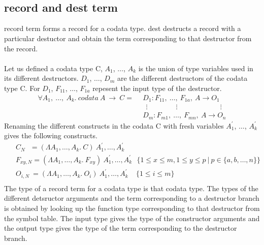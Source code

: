 \documentclass[11pt]{article}
\begin{document}
~~\\~~\\
\subsection {record and dest term}
{\sf record } term forms a record for a codata type. {\sf dest} destructs a record with a particular destuctor and obtain the term corresponding to that destructor from the record.
~~\\~~\\
Let us defined a codata type C, $A_1$, $\ldots$, $A_k$ is the union of type variables used in its different destructors. $D_1$, $\ldots$, $D_m$ are the different destructors of the codata type C. For $D_1$, $F_{11}$, $\ldots$, $F_{1a}$ repesent the input type of the destructor. 
\begin{align*} 
\forall A_1,~ \ldots,~A_k.~codata~ A ~\to~ C =
 & ~~ D_1 : F_{11},~ \ldots, ~ F_{1a},~A \to O_1 \\
 & ~~~~ \vdots \qquad\qquad \vdots \qquad\qquad\qquad \vdots \\ 
 & ~~ D_m : F_{m1} ,~ \ldots, ~ F_{mn},~A \to O_n
\end{align*}
Renaming the different constructs in the codata C with fresh variables $A_1^{\prime}$, $\ldots$, $A_k^{\prime}$ gives the following constructs. 
\begin{align*}
 & ~~ C_{N} ~~~ = (\Lambda A_1,\ldots,A_k.~ C)~A_1^{\prime},\ldots,A_k^{\prime}\\ 
 & ~~ F_{xy,N} = (\Lambda A_1,\ldots,A_k.~F_{xy})~A_1^{\prime},\ldots,A_k^{\prime} 
 ~~~  \{1 \leq x \leq m,1 \leq y \leq p ~|~ p \in \{a,b,\ldots,n\} \} \\
 & ~~ O_{i,N} ~= (\Lambda A_1,\ldots,A_k.~ O_i)~A_1^{\prime},\ldots,A_k^{\prime} 
  ~~~~~ \{ 1 \leq i \leq m \} \\
 \end{align*}
The type of a {\sf record} term for a codata type is that codata type. The types of the different detsructor arguments and the term corresponding to a destructor branch is obtained by looking up the function type corresponding to that destructor from the symbol table. The input type gives the type of the constructor arguments and the output type gives the type of the term corresponding to the destructor branch.
~~\\~~\\ 
\end{document}

